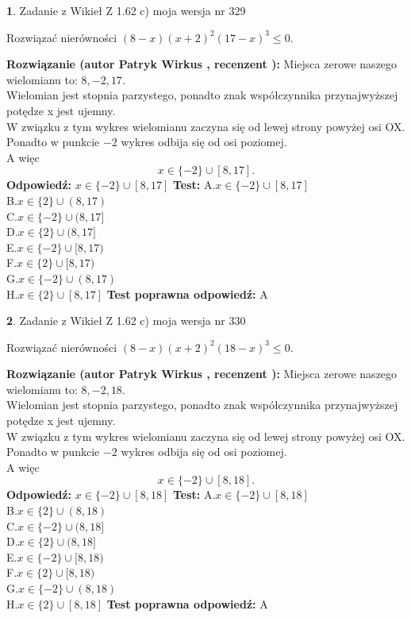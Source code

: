 \documentclass[12pt, a4paper]{article}
\theoremstyle{definition} %
\newtheorem{zad}{}
\newcommand{\zadStart}[1]{\begin{zad}#1\newline}
\newcommand{\zadStop}{\end{zad}}
\newcommand{\rozwStart}[2]{\noindent \textbf{Rozwiązanie (autor #1 , recenzent #2): }\newline}
\newcommand{\rozwStop}{\newline}
\newcommand{\odpStart}{\noindent \textbf{Odpowiedź:}\newline}
\newcommand{\odpStop}{\newline}
\newcommand{\testStart}{\noindent \textbf{Test:}\newline}
\newcommand{\testStop}{\newline}
\newcommand{\kluczStart}{\noindent \textbf{Test poprawna odpowiedź:}\newline}
\newcommand{\kluczStop}{\newline}
\begin{document}
\zadStart{Zadanie z Wikieł Z 1.62 c) moja wersja nr 329}

Rozwiązać nierówności $(8-x)(x+2)^{2}(17-x)^{3}\le0$.
\zadStop
\rozwStart{Patryk Wirkus}{}
Miejsca zerowe naszego wielomianu to: $8, -2, 17$.\\
Wielomian jest stopnia parzystego, ponadto znak współczynnika przy\linebreak najwyższej potędze x jest ujemny.\\ W związku z tym wykres wielomianu zaczyna się od lewej strony powyżej osi OX.\\
Ponadto w punkcie $-2$ wykres odbija się od osi poziomej.\\
A więc $$x \in \{-2\} \cup [8,17].$$
\rozwStop
\odpStart
$x \in \{-2\} \cup [8,17]$
\odpStop
\testStart
A.$x \in \{-2\} \cup [8,17]$\\
B.$x \in \{2\} \cup (8,17)$\\
C.$x \in \{-2\} \cup (8,17]$\\
D.$x \in \{2\} \cup (8,17]$\\
E.$x \in \{-2\} \cup [8,17)$\\
F.$x \in \{2\} \cup [8,17)$\\
G.$x \in \{-2\} \cup (8,17)$\\
H.$x \in \{2\} \cup [8,17]$
\testStop
\kluczStart
A
\kluczStop



\zadStart{Zadanie z Wikieł Z 1.62 c) moja wersja nr 330}

Rozwiązać nierówności $(8-x)(x+2)^{2}(18-x)^{3}\le0$.
\zadStop
\rozwStart{Patryk Wirkus}{}
Miejsca zerowe naszego wielomianu to: $8, -2, 18$.\\
Wielomian jest stopnia parzystego, ponadto znak współczynnika przy\linebreak najwyższej potędze x jest ujemny.\\ W związku z tym wykres wielomianu zaczyna się od lewej strony powyżej osi OX.\\
Ponadto w punkcie $-2$ wykres odbija się od osi poziomej.\\
A więc $$x \in \{-2\} \cup [8,18].$$
\rozwStop
\odpStart
$x \in \{-2\} \cup [8,18]$
\odpStop
\testStart
A.$x \in \{-2\} \cup [8,18]$\\
B.$x \in \{2\} \cup (8,18)$\\
C.$x \in \{-2\} \cup (8,18]$\\
D.$x \in \{2\} \cup (8,18]$\\
E.$x \in \{-2\} \cup [8,18)$\\
F.$x \in \{2\} \cup [8,18)$\\
G.$x \in \{-2\} \cup (8,18)$\\
H.$x \in \{2\} \cup [8,18]$
\testStop
\kluczStart
A
\kluczStop
\end{document}
